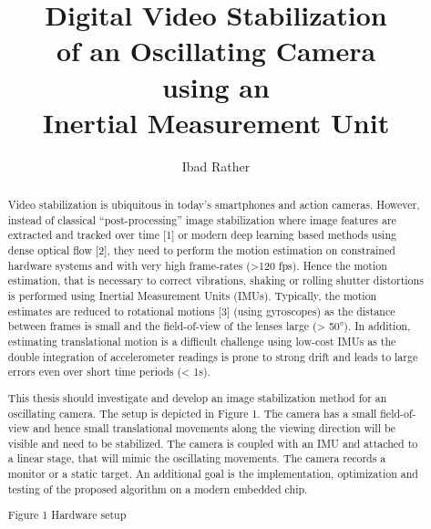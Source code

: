 \documentclass[
thesis%
]{csthes}
\title{Digital Video Stabilization \\ of an Oscillating Camera \\
using an \\ Inertial Measurement Unit}
\subtitle{}%
\author{Ibad Rather \matr{1532894}}
\begin{document}
\maketitle
\begin{abstract}
Video stabilization is ubiquitous in today's smartphones and action cameras. However, instead of
classical “post-processing” image stabilization where image features are extracted and tracked over
time [1] or modern deep learning based methods using dense optical flow [2], they need to perform
the motion estimation on constrained hardware systems and with very high frame-rates (>120 fps).
Hence the motion estimation, that is necessary to correct vibrations, shaking or rolling shutter
distortions is performed using Inertial Measurement Units (IMUs). Typically, the motion estimates are
reduced to rotational motions [3] (using gyroscopes) as the distance between frames is small and the
field-of-view of the lenses large (> 50°). In addition, estimating translational motion is a difficult
challenge using low-cost IMUs as the double integration of accelerometer readings is prone to strong
drift and leads to large errors even over short time periods (< 1s). 

This thesis should investigate and develop an image stabilization method for an oscillating camera. The
setup is depicted in Figure 1. The camera has a small field-of-view and hence small translational
movements along the viewing direction will be visible and need to be stabilized. The camera is coupled
with an IMU and attached to a linear stage, that will mimic the oscillating movements. The camera
records a monitor or a static target. An additional goal is the implementation, optimization and testing
of the proposed algorithm on a modern embedded chip.



Figure 1 Hardware setup


\end{abstract}
\tableofcontents%

\listoftables%
\listoffigures%

\mainmatter

\end{document}

